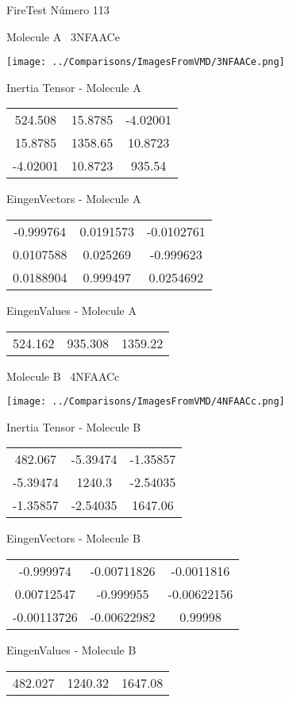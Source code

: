\vtab[-3cm]
\begin{center}
{\large FireTest \tab Número 113}
\end{center}
\begin{multicols}{2}
\begin{center}

Molecule A \
3NFAACe

\texttt{[image: ../Comparisons/ImagesFromVMD/3NFAACe.png]}

Inertia Tensor - Molecule A \\
\begin{tabular}{|c c c|}
524.508	 & 	15.8785	 & 	-4.02001	 \\
15.8785	 & 	1358.65	 & 	10.8723	 \\
-4.02001	 & 	10.8723	 & 	935.54
\end{tabular}

\vtab
 EingenVectors - Molecule A     \\
\begin{tabular}{|c c c|}
-0.999764	 & 	0.0191573	 & 	-0.0102761	 \\
0.0107588	 & 	0.025269	 & 	-0.999623	 \\
0.0188904	 & 	0.999497	 & 	0.0254692
\end{tabular}

\vtab
 EingenValues - Molecule A     \\
\begin{tabular}{|c c c|}
524.162	 & 	935.308	 & 	1359.22	 \\
\end{tabular}
\columnbreak

Molecule B \
4NFAACc

\texttt{[image: ../Comparisons/ImagesFromVMD/4NFAACc.png]}

Inertia Tensor - Molecule B \\
\begin{tabular}{|c c c|}
482.067	 & 	-5.39474	 & 	-1.35857	 \\
-5.39474	 & 	1240.3	 & 	-2.54035	 \\
-1.35857	 & 	-2.54035	 & 	1647.06
\end{tabular}

\vtab
 EingenVectors - Molecule B     \\
\begin{tabular}{|c c c|}
-0.999974	 & 	-0.00711826	 & 	-0.0011816	 \\
0.00712547	 & 	-0.999955	 & 	-0.00622156	 \\
-0.00113726	 & 	-0.00622982	 & 	0.99998
\end{tabular}

\vtab
 EingenValues - Molecule B     \\
\begin{tabular}{|c c c|}
482.027	 & 	1240.32	 & 	1647.08	 \\
\end{tabular}

\end{center}
\end{multicols}

